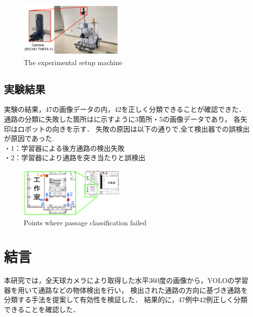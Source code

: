 \documentclass[10pt]{jarticle}
\begin{document}
        \begin{figure}[!b]
            \includegraphics[width=0.46\textwidth]{./fig/experimental_machine_wide.png}
            \caption{The experimental setup machine}
            \label{fig:experiment_machine}
            \end{figure}
    
     \subsection{実験結果}%
     実験の結果，47の画像データの内，42を正しく分類できることが確認できた．
     通路の分類に失敗した箇所はに示すように3箇所・5の画像データであり，
     各矢印はロボットの向きを示す．
     失敗の原因は以下の通りで,全て検出器での誤検出が原因であった.\\
     ・1：学習器による後方通路の検出失敗\\
     ・2：学習器により通路を突き当たりと誤検出
     \begin{figure}[!b]
         \includegraphics[width=0.46\textwidth]{./fig/experiment_result.png}
         \caption{Points where passage classification failed}
         \label{fig:miss_classification}
     \end{figure}
    
    \section{結\hspace{2zw}言}%
    本研究では，全天球カメラにより取得した水平360度の画像から，YOLOの学習器を用いて通路などの物体検出を行い，
    検出された通路の方向に基づき通路を分類する手法を提案して有効性を検証した．
    結果的に，47例中42例正しく分類できることを確認した．
\end{document}
